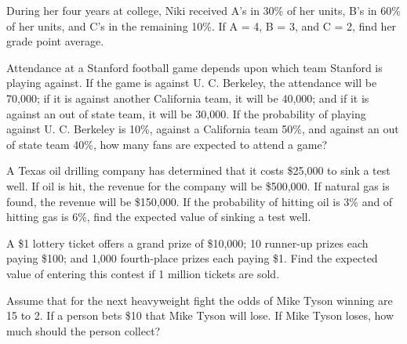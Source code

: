 \begin{puzzle}
    During her four years at college, Niki received A's in 30\% of her units, B's in 60\% of her units, and C's in the remaining 10\%. If A = 4, B = 3, and C = 2, find her grade point average.
\end{puzzle}

\begin{puzzle}
    Attendance at a Stanford football game depends upon which team Stanford is playing against. If the game is against U. C. Berkeley, the attendance will be 70,000; if it is against another California team, it will be 40,000; and if it is against an out of state team, it will be 30,000. If the probability of playing against U. C. Berkeley is 10\%, against a California team 50\%, and against an out of state team 40\%, how many fans are expected to attend a game?
\end{puzzle}

\begin{puzzle}
    A Texas oil drilling company has determined that it costs \$25,000 to sink a test well. If oil is hit, the revenue for the company will be \$500,000. If natural gas is found, the revenue will be \$150,000. If the probability of hitting oil is 3\% and of hitting gas is 6\%, find the expected value of sinking a test well.
\end{puzzle}

\begin{puzzle}
    A \$1 lottery ticket offers a grand prize of \$10,000; 10 runner-up prizes each paying \$100; and 1,000 fourth-place prizes each paying \$1. Find the expected value of entering this contest if 1 million tickets are sold.
\end{puzzle}

\begin{puzzle}
    Assume that for the next heavyweight fight the odds of Mike Tyson winning are 15 to 2. If a person bets \$10 that Mike Tyson will lose. If Mike Tyson loses, how much should the person collect?
\end{puzzle}


